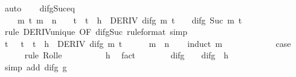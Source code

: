 \begin{isabellebody}
\ auto\isanewline
\ \ \isamarkupfalse%
\ difg{\isacharunderscore}{\kern0pt}Suc{\isacharunderscore}{\kern0pt}eq{\isacharunderscore}{\kern0pt}{}{\isacharcolon}{\kern0pt}\isanewline
\ \ \ \ {\isachardoublequoteopen}{\isasymAnd}m\ t{\isachardot}{\kern0pt}\ m\ {\isacharless}{\kern0pt}\ n\ {\isasymLongrightarrow}\ {}\ {\isasymle}\ t\ {\isasymLongrightarrow}\ t\ {\isasymle}\ h\ {\isasymLongrightarrow}\ DERIV\ {\isacharparenleft}{\kern0pt}difg\ m{\isacharparenright}{\kern0pt}\ t\ {\isacharcolon}{\kern0pt}{\isachargreater}{\kern0pt}\ {}\ {\isasymLongrightarrow}\ difg\ {\isacharparenleft}{\kern0pt}Suc\ m{\isacharparenright}{\kern0pt}\ t\ {\isacharequal}{\kern0pt}\ {}{\isachardoublequoteclose}\isanewline
\ \ \ \ \isamarkupfalse%
\ {\isacharparenleft}{\kern0pt}rule\ DERIV{\isacharunderscore}{\kern0pt}unique\ {\isacharbrackleft}{\kern0pt}OF\ difg{\isacharunderscore}{\kern0pt}Suc\ {\isacharbrackleft}{\kern0pt}rule{\isacharunderscore}{\kern0pt}format{\isacharbrackright}{\kern0pt}{\isacharbrackright}{\kern0pt}{\isacharparenright}{\kern0pt}\ simp\isanewline
\isanewline
\ \ \isamarkupfalse%
\ {\isachardoublequoteopen}{\isasymexists}t{\isachardot}{\kern0pt}\ {}\ {\isacharless}{\kern0pt}\ t\ {\isasymand}\ t\ {\isacharless}{\kern0pt}\ h\ {\isasymand}\ DERIV\ {\isacharparenleft}{\kern0pt}difg\ m{\isacharparenright}{\kern0pt}\ t\ {\isacharcolon}{\kern0pt}{\isachargreater}{\kern0pt}\ {}{\isachardoublequoteclose}\isanewline
\ \ \isamarkupfalse%
\ {\isacartoucheopen}m\ {\isacharless}{\kern0pt}\ n{\isacartoucheclose}\isanewline
\ \ \isamarkupfalse%
\ {\isacharparenleft}{\kern0pt}induct\ m{\isacharparenright}{\kern0pt}\isanewline
\ \ \ \ \isamarkupfalse%
\ {}\isanewline
\ \ \ \ \isamarkupfalse%
\ {\isacharquery}{\kern0pt}case\isanewline
\ \ \ \ \isamarkupfalse%
\ {\isacharparenleft}{\kern0pt}rule\ Rolle{\isacharparenright}{\kern0pt}\isanewline
\ \ \ \ \ \ \isamarkupfalse%
\ {\isachardoublequoteopen}{}\ {\isacharless}{\kern0pt}\ h{\isachardoublequoteclose}\ \isamarkupfalse%
\ fact\isanewline
\ \ \ \ \ \ \isamarkupfalse%
\ {\isachardoublequoteopen}difg\ {}\ {}\ {\isacharequal}{\kern0pt}\ difg\ {}\ h{\isachardoublequoteclose}\isanewline
\ \ \ \ \ \ \ \ \isamarkupfalse%
\ {\isacharparenleft}{\kern0pt}simp\ add{\isacharcolon}{\kern0pt}\ difg{\isacharunderscore}{\kern0pt}{}\ g{}{\isacharparenright}{\kern0pt}\isanewline

\end{isabellebody}
